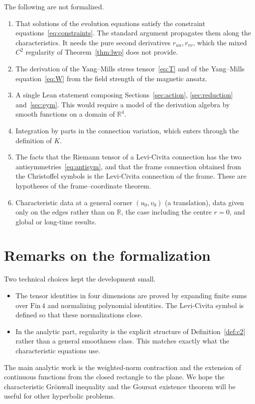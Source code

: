 \documentclass[11pt]{amsart}
\theoremstyle{definition}
\theoremstyle{remark}
\newcommand{\R}{\mathbb{R}}
\begin{document}
The following are not formalized.
\begin{enumerate}[label=(\alph*)]
\item That solutions of the evolution equations satisfy the constraint equations~\eqref{eq:constraints}. The standard argument propagates them along the characteristics. It needs the pure second derivatives $r_{uu},r_{vv}$, which the mixed $C^2$ regularity of Theorem~\ref{thm:lwp} does not provide.
\item The derivation of the Yang--Mills stress tensor~\eqref{eq:T} and of the Yang--Mills equation~\eqref{eq:W} from the field strength of the magnetic ansatz.
\item A single Lean statement composing Sections~\ref{sec:action}, \ref{sec:reduction} and~\ref{sec:eym}. This would require a model of the derivation algebra by smooth functions on a domain of $\R^4$.
\item Integration by parts in the connection variation, which enters through the definition of $K$.
\item The facts that the Riemann tensor of a Levi-Civita connection has the two antisymmetries~\eqref{eq:antisym}, and that the frame connection obtained from the Christoffel symbols is the Levi-Civita connection of the frame. These are hypotheses of the frame--coordinate theorem.
\item Characteristic data at a general corner $(u_0,v_0)$ (a translation), data given only on the edges rather than on $\R$, the case including the centre $r=0$, and global or long-time results.
\end{enumerate}

\section{Remarks on the formalization}

Two technical choices kept the development small.
\begin{itemize}
\item The tensor identities in four dimensions are proved by expanding finite sums over $\mathrm{Fin}\,4$ and normalizing polynomial identities. The Levi-Civita symbol is defined so that these normalizations close.
\item In the analytic part, regularity is the explicit structure of Definition~\ref{def:c2} rather than a general smoothness class. This matches exactly what the characteristic equations use.
\end{itemize}
The main analytic work is the weighted-norm contraction and the extension of continuous functions from the closed rectangle to the plane. We hope the characteristic Gr\"onwall inequality and the Goursat existence theorem will be useful for other hyperbolic problems.
\end{document}
